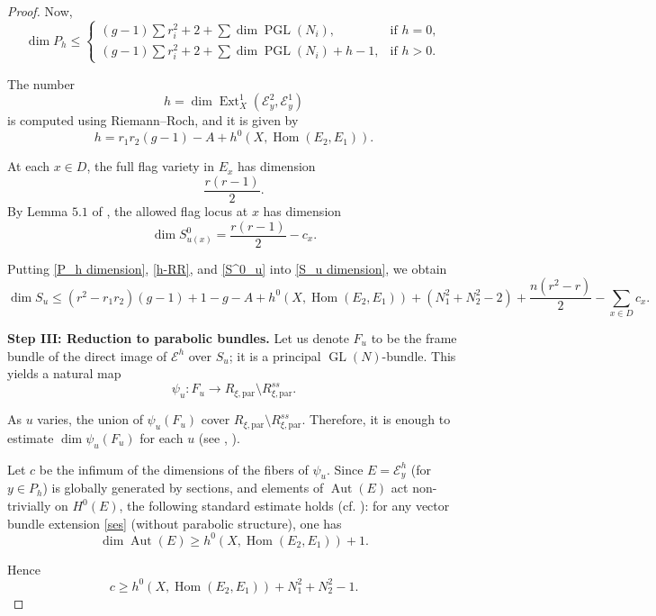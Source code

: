 \documentclass[11pt, reqno]{amsart}
\numberwithin{equation}{section}
\newcommand{\Hom}{\operatorname{Hom}}
\newcommand{\Ext}{\operatorname{Ext}}
\DeclareMathOperator{\Aut}{Aut}
\DeclareMathOperator{\GL}{GL}
\DeclareMathOperator{\PGL}{PGL}
\theoremstyle{definition}
\begin{document}
\begin{proof}
Now,
\begin{equation}\label{P_h dimension}
\dim P_h \leq 
\begin{cases}
(g-1)\sum r_i^2+2+\sum \dim \PGL(N_i), & \text{if } h=0,\\[4pt]
(g-1)\sum r_i^2+2+\sum \dim \PGL(N_i)+ h-1, & \text{if } h>0.
\end{cases}
\end{equation}

The number 
\[
h= \dim \Ext^1_X(\mathcal{E}^2_y,\mathcal{E}^1_y)
\]
is computed using Riemann--Roch, and it is given by
\begin{equation}\label{h-RR}
h= 
r_1r_2(g-1)-A+h^0(X,\Hom(E_2,E_1)).
\end{equation}

At each $x\in D$, the full flag variety in $E_x$ has dimension
\[
\frac{r(r-1)}{2}.
\]
By Lemma $5.1$ of \cite{S00}, the allowed flag locus at $x$ has dimension
\begin{equation}\label{S^0_u}
\dim S^0_{u(x)} = \frac{r(r-1)}{2}-c_x.
\end{equation}

Putting \eqref{P_h dimension}, \eqref{h-RR}, and \eqref{S^0_u} into \eqref{S_u dimension}, we obtain
\begin{equation*}
\dim S_u
\le
(r^2-r_1r_2)(g-1)+1-g-A+h^0(X,\Hom(E_2,E_1))+(N_1^2+N_2^2-2)
+\frac{n(r^2-r)}{2}-\sum_{x\in D}c_x.
\end{equation*}

\noindent\textbf{Step III: Reduction to parabolic bundles.} Let us denote $F_u$ to be the frame bundle of the direct image of $\mathcal{E}^{h}$ over $S_u$; it is a principal $\GL(N)$-bundle. This yields a natural map
\[
\psi_u:F_u\to R_{\xi,\mathrm{par}}\setminus R^{ss}_{\xi,\mathrm{par}}.
\]

As $u$ varies, the union of $\psi_u(F_u)$ cover $R_{\xi,\mathrm{par}}\setminus R^{ss}_{\xi,\mathrm{par}}$. Therefore, it is enough to estimate $\dim \psi_u(F_u)$ for each $u$ (see \cite{S00}, \cite{BB23}).

Let $c$ be the infimum of the dimensions of the fibers of $\psi_u$. Since $E= \mathcal{E}^h_y$ (for $y \in P_h$) is globally generated by sections, and elements of $\Aut(E)$ act non-trivially on $H^0(E)$, the following standard estimate holds (cf. \cite{BB23}): for any vector bundle extension \eqref{ses} (without parabolic structure), one has
\[
\dim \Aut(E) \geq h^0(X,\Hom(E_2,E_1)) + 1.
\]

Hence
\[
c \geq h^0(X,\Hom(E_2,E_1)) + N_1^2 + N_2^2 - 1.
\]


\end{proof}
\end{document}
